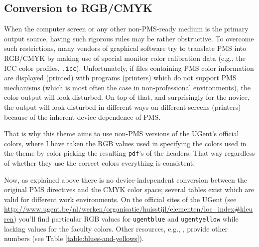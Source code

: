 \documentclass[a4paper,10pt]{article}
\theoremstyle{definition}
\begin{document}
\subsection{Conversion to RGB/CMYK}

When the computer screen or any other non-PMS-ready medium is the primary output source, having such rigorous rules may be rather obstructive. To overcome such restrictions, many vendors of graphical software try to translate PMS into RGB/CMYK by making use of special monitor color calibration data (e.g., the ICC color profiles, \verb!.icc!). Unfortunately, if files containing PMS color information are displayed (printed) with programs (printers) which do not support PMS mechanisms (which is most often the case in non-professional environments), the color output will look disturbed. On top of that, and surprisingly for the novice, the output will look disturbed in different ways on different screens (printers) because of the inherent device-dependence of PMS.

That is why this theme aims to use non-PMS versions of the UGent's official colors, where I have taken the RGB values used in specifying the colors used in the theme by color picking the resulting \verb|pdf|'s of the headers. That way regardless of whether they use the correct colors everything is consistent.

Now, as explained above there is no device-independent conversion between the original PMS directives and the CMYK color space; several tables exist which are valid for different work environments. On the official sites of the UGent (see \url{http://www.ugent.be/nl/werken/organisatie/huisstijl/elementen/loc_index#kleuren}) you'll find particular RGB values for \verb|ugentblue| and \verb|ugentyellow| while lacking values for the faculty colors. Other resources, e.g., \cite{conversion-chart}, provide other numbers (see Table \ref{table:blues-and-yellows}).
\end{document}
